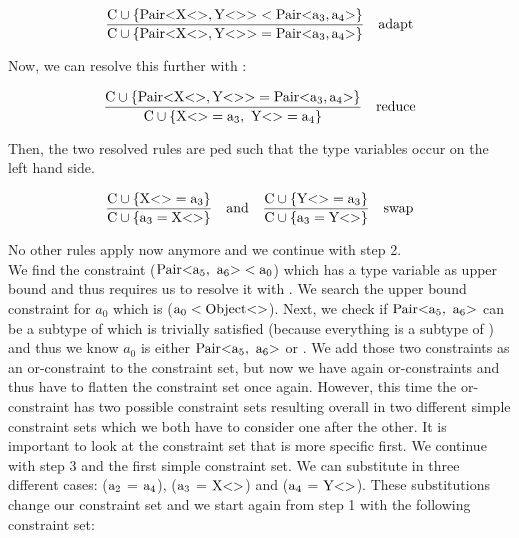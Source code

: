 \begin{align*}
    \frac{\text{C} \cup \{ \text{Pair} \text{<} \text{X} \text{<}  \text{>}, \text{Y} \text{<}  \text{>} \text{>} < \text{Pair} \text{<} \text{a}_{3}, \text{a}_{4} \text{>} \} }{\text{C} \cup \{ \text{Pair} \text{<} \text{X} \text{<}  \text{>}, \text{Y} \text{<}  \text{>} \text{>} = \text{Pair} \text{<} \text{a}_{3}, \text{a}_{4} \text{>} \} } \quad \text{adapt}
\end{align*}

Now, we can resolve this further with :

\begin{align*}
    \frac{\cand \{ \nvtt{Pair}{\nvtt{X}{}, \nvtt{Y}{}} = \nvtt{Pair}{\fa{3}, \fa{4}} \} }{\cand \{ \nvtt{X}{} = \fa{3}, \ \nvtt{Y}{} = \fa{4} \} } \quad \text{reduce}
\end{align*}

Then, the two resolved rules are ped such that the type variables  occur on the left hand side.

\begin{align*}
    \frac{\text{C} \cup \{ \text{X} \text{<}  \text{>} = \text{a}_{3} \} }{\text{C} \cup \{ \text{a}_{3} = \text{X} \text{<}  \text{>} \} } \quad \text{and} \quad \frac{\text{C} \cup \{ \text{Y} \text{<}  \text{>} = \text{a}_{3} \} }{\text{C} \cup \{ \text{a}_{3} = \text{Y} \text{<}  \text{>} \} } \quad \text{swap}
\end{align*}

No other rules apply now anymore and we continue with step 2.\\

We find the constraint ($\nvtt{Pair}{\fa{5}, \ \fa{6}} < \fa{0}$) which has a type variable as upper bound and thus requires us to resolve it with . We search the upper bound constraint for $a_0$ which is ($\text{a}_{0} < \text{Object} \text{<}  \text{>}$).
Next, we check if $\nvtt{Pair}{\fa{5}, \ \fa{6}}$ can be a subtype of  which is trivially satisfied (because everything is a subtype of ) and thus we know $a_0$ is either $\nvtt{Pair}{\fa{5}, \ \fa{6}}$ or . We add those two constraints as an or-constraint
to the constraint set, but now we have again or-constraints and thus have to flatten the constraint set once again. However, this time the or-constraint has two possible constraint sets resulting overall in two different simple constraint sets which we both have to consider one after the other.
It is important to look at the constraint set that is more specific first. We continue with step 3 and the first simple constraint set. We can substitute in three different cases: ($\text{a}_{2}$ = $\text{a}_{4}$), ($\text{a}_{3}$ = $\text{X} \text{<}  \text{>}$) and ($\text{a}_{4}$ = $\text{Y} \text{<}  \text{>}$).
These substitutions change our constraint set and we start again from step 1 with the following constraint set:

